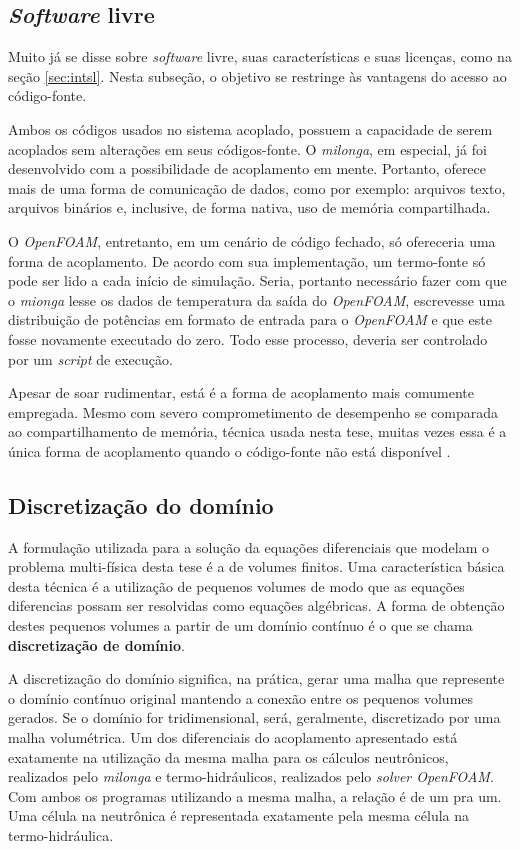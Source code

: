 \subsection{\textit{Software} livre}
\label{subsec:sl}

Muito já se disse sobre \textit{software} livre, suas características e suas licenças, como na
seção \ref{sec:intsl}. Nesta subseção, o objetivo se restringe às vantagens do acesso ao
código-fonte.

Ambos os códigos usados no sistema acoplado, possuem a capacidade de serem acoplados sem alterações
em seus códigos-fonte. O \textit{milonga}, em especial, já foi desenvolvido com a possibilidade
de acoplamento em mente. Portanto, oferece mais de uma forma de comunicação de dados, como por exemplo:
arquivos texto, arquivos binários e, inclusive, de forma nativa, uso de memória compartilhada.

O \textit{OpenFOAM}, entretanto, em um cenário de código fechado, só ofereceria uma forma de
acoplamento. De acordo com sua implementação, um termo-fonte só pode ser lido a cada início de
simulação. Seria, portanto necessário fazer com que o \textit{mionga} lesse os dados de temperatura
da saída do \textit{OpenFOAM}, escrevesse uma distribuição de potências em formato de entrada
para o \textit{OpenFOAM} e que este fosse novamente executado do zero. Todo esse processo, deveria
ser controlado por um \textit{script} de execução.

Apesar de soar rudimentar, está é a forma de acoplamento mais comumente empregada.
Mesmo com severo comprometimento de desempenho se comparada ao compartilhamento de
memória, técnica usada nesta tese, muitas vezes essa é a única forma de acoplamento
quando o código-fonte não está disponível \cite{Ivanov2007}.

\subsection{Discretização do domínio}
\label{subsec:dd}

A formulação utilizada para a solução da equações diferenciais que modelam o problema multi-física desta
tese é a de volumes finitos. Uma característica básica desta técnica é a utilização de pequenos volumes
de modo que as equações diferencias possam ser resolvidas como equações algébricas. A forma de obtenção
destes pequenos volumes a partir de um domínio contínuo é o que se chama \textbf{discretização de domínio}. 

A discretização do domínio significa, na prática, gerar uma malha que represente o domínio contínuo original
mantendo a conexão entre os pequenos volumes gerados. Se o domínio for tridimensional, será, geralmente,
discretizado por uma malha volumétrica. Um dos diferenciais do acoplamento apresentado está exatamente na
utilização da mesma malha para os cálculos neutrônicos, realizados pelo \textit{milonga} e termo-hidráulicos,
realizados pelo \textit{solver OpenFOAM}. Com ambos os programas utilizando a mesma malha, a relação é de um
pra um. Uma célula na neutrônica é representada exatamente pela mesma célula na termo-hidráulica.


